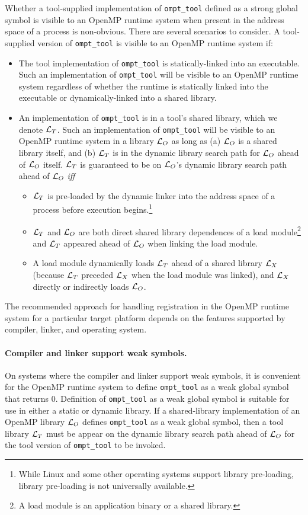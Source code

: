 \documentclass{article}
\begin{document}
{Whether a tool-supplied implementation of  \verb|ompt_tool| defined as a strong global symbol is visible to an OpenMP runtime system when present in the address space of a process is non-obvious. There are several scenarios to consider.
A tool-supplied version of \verb|ompt_tool|  is visible to an OpenMP runtime system if:
\begin{itemize}
\item The tool implementation of  \verb|ompt_tool| is statically-linked into an executable. Such an implementation of  \verb|ompt_tool| will  be visible to an OpenMP runtime system regardless of whether the runtime is statically linked into the executable or dynamically-linked into a shared library. 
\item An implementation of  \verb|ompt_tool|  is in a tool's shared library, which we denote ${\cal L}_T$. Such an implementation of  \verb|ompt_tool| will  be visible to an OpenMP runtime system in a library ${\cal L}_O$ as long as (a) ${\cal L}_O$ is a shared library itself, and (b) ${\cal L}_T$ is in the dynamic library search path for ${\cal L}_O$ ahead of ${\cal L}_O$  itself. ${\cal L}_T$ is guaranteed to be on ${\cal L}_O$'s dynamic library search path ahead of ${\cal L}_O$ {\em iff}
\begin{itemize}
\item ${\cal L}_T$ is pre-loaded by the dynamic linker into the address space of a process before execution begins.\footnote{While Linux and some other operating systems support library pre-loading, library pre-loading is not universally available.}
\item ${\cal L}_T$ and ${\cal L}_O$ are both direct shared library dependences of a load module\footnote{A load module is an application binary or a  shared library.}  and ${\cal L}_T$ appeared ahead of ${\cal L}_O$ when linking the load module.
\item A load module dynamically loads ${\cal L}_T$  ahead of a shared library ${\cal L}_X$ (because ${\cal L}_T$  preceded ${\cal L}_X$ when the load module was linked), and  ${\cal L}_X$ directly or indirectly loads ${\cal L}_O$.
\end{itemize}
\end{itemize}

The recommended approach for handling registration in the OpenMP runtime system for a particular target platform depends on the features supported by  compiler, linker, and operating system.

\paragraph{Compiler and linker support weak symbols.}
On systems  where the compiler and linker support weak symbols, it is convenient for the 
OpenMP runtime system to define \verb|ompt_tool| as a weak global symbol  that returns 0. Definition of \verb|ompt_tool| as a weak global symbol is suitable for use in either a static or dynamic library. If a shared-library implementation of an OpenMP library ${\cal L}_O$ defines \verb|ompt_tool| as a weak global symbol, then a tool library  ${\cal L}_T$ must be appear on the dynamic library search path ahead of ${\cal L}_O$ for the tool version of  \verb|ompt_tool| to be invoked.

}
\end{document}
